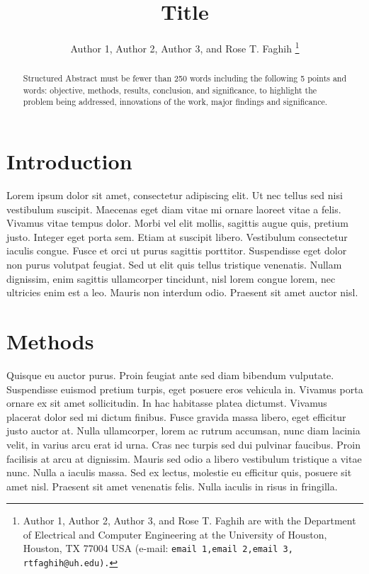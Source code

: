 \documentclass[10pt,conference]{ieeeconf}
\begin{document}
\title{Title}


\author{Author 1, Author 2, Author 3, and Rose T. Faghih \thanks{Author 1, Author 2, Author 3, and Rose T. Faghih are with the Department of Electrical and Computer Engineering at the University of Houston, Houston, TX 77004 USA (e-mail: \tt\small  email 1,email 2,email 3, rtfaghih@uh.edu).} 
}


\maketitle

\begin{abstract}
Structured Abstract must be fewer than 250 words including the following 5 points and words: objective, methods, results, conclusion, and significance, to highlight the problem being addressed, innovations of the work, major findings and significance. 

\end{abstract}

\section{Introduction} \label{introduction}

Lorem ipsum dolor sit amet, consectetur adipiscing elit. Ut nec tellus sed nisi vestibulum suscipit. Maecenas eget diam vitae mi ornare laoreet vitae a felis. Vivamus vitae tempus dolor. Morbi vel elit mollis, sagittis augue quis, pretium justo. Integer eget porta sem. Etiam at suscipit libero. Vestibulum consectetur iaculis congue. Fusce et orci ut purus sagittis porttitor. Suspendisse eget dolor non purus volutpat feugiat. Sed ut elit quis tellus tristique venenatis. Nullam dignissim, enim sagittis ullamcorper tincidunt, nisl lorem congue lorem, nec ultricies enim est a leo. Mauris non interdum odio. Praesent sit amet auctor nisl.

\section{Methods} \label{method}

Quisque eu auctor purus. Proin feugiat ante sed diam bibendum vulputate. Suspendisse euismod pretium turpis, eget posuere eros vehicula in. Vivamus porta ornare ex sit amet sollicitudin. In hac habitasse platea dictumst. Vivamus placerat dolor sed mi dictum finibus. Fusce gravida massa libero, eget efficitur justo auctor at. Nulla ullamcorper, lorem ac rutrum accumsan, nunc diam lacinia velit, in varius arcu erat id urna. Cras nec turpis sed dui pulvinar faucibus. Proin facilisis at arcu at dignissim. Mauris sed odio a libero vestibulum tristique a vitae nunc. Nulla a iaculis massa. Sed ex lectus, molestie eu efficitur quis, posuere sit amet nisl. Praesent sit amet venenatis felis. Nulla iaculis in risus in fringilla.
\end{document}
